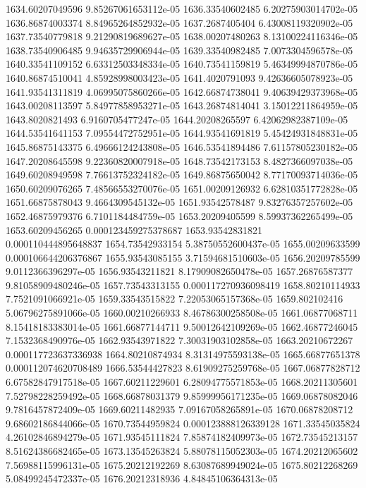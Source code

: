 {1634.60207049596 9.85267061653112e-05
1636.33540602485 6.20275903014702e-05
1636.86874003374 8.84965264852932e-05
1637.2687405404 6.43008119320902e-05
1637.73540779818 9.21290819689627e-05
1638.00207480263 8.13100224116346e-05
1638.73540906485 9.94635729906944e-05
1639.33540982485 7.0073304596578e-05
1640.33541109152 6.63312503348334e-05
1640.73541159819 5.46349994870786e-05
1640.86874510041 4.85928998003423e-05
1641.4020791093 9.42636605078923e-05
1641.93541311819 4.06995075860266e-05
1642.66874738041 9.40639429373968e-05
1643.00208113597 5.84977858953271e-05
1643.26874814041 3.15012211864959e-05
1643.8020821493 6.9160705477247e-05
1644.20208265597 6.42062982387109e-05
1644.53541641153 7.09554472752951e-05
1644.93541691819 5.45424931848831e-05
1645.86875143375 6.49666124243808e-05
1646.53541894486 7.61157805230182e-05
1647.20208645598 9.22360820007918e-05
1648.73542173153 8.4827366097038e-05
1649.60208949598 7.76613752324182e-05
1649.86875650042 8.77170093714036e-05
1650.60209076265 7.48566553270076e-05
1651.00209126932 6.62810351772828e-05
1651.66875878043 9.4664309545132e-05
1651.93542578487 9.83276357257602e-05
1652.46875979376 6.7101184484759e-05
1653.20209405599 8.59937362265499e-05
1653.60209456265 0.000123459275378687
1653.93542831821 0.000110444895648837
1654.73542933154 5.38750552600437e-05
1655.00209633599 0.000106644206376867
1655.93543085155 3.71594681510603e-05
1656.20209785599 9.0112366396297e-05
1656.93543211821 8.17909082650478e-05
1657.26876587377 9.81058909480246e-05
1657.73543313155 0.000117270936098419
1658.80210114933 7.7521091066921e-05
1659.33543515822 7.22053065157368e-05
1659.802102416 5.06796275891066e-05
1660.00210266933 8.46786300258508e-05
1661.06877068711 8.15418183383014e-05
1661.66877144711 9.50012642109269e-05
1662.46877246045 7.1532368490976e-05
1662.93543971822 7.30031903102858e-05
1663.20210672267 0.000117723637336938
1664.80210874934 8.31314975593138e-05
1665.66877651378 0.000112074620708489
1666.53544427823 8.61909275259768e-05
1667.06877828712 6.67582847917518e-05
1667.60211229601 6.28094775571853e-05
1668.20211305601 7.52798228259492e-05
1668.66878031379 9.85999956171235e-05
1669.06878082046 9.7816457872409e-05
1669.60211482935 7.09167058265891e-05
1670.06878208712 9.68602186844066e-05
1670.73544959824 0.000123888126339128
1671.33545035824 4.26102846894279e-05
1671.93545111824 7.85874182409973e-05
1672.73545213157 8.51624386682465e-05
1673.13545263824 5.88078115052303e-05
1674.20212065602 7.56988115996131e-05
1675.20212192269 8.63087689949024e-05
1675.80212268269 5.08499245472337e-05
1676.20212318936 4.84845106364313e-05
}
